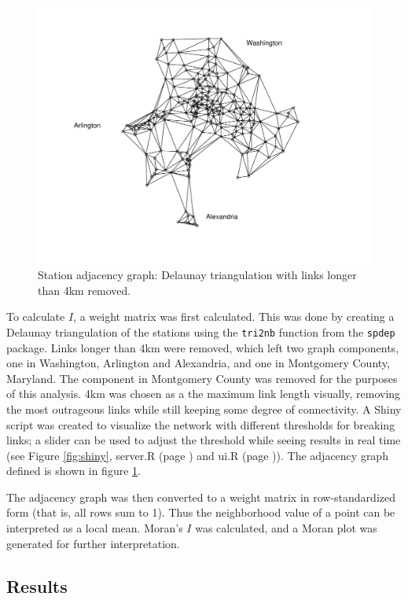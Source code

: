\documentclass[letterpaper,11pt]{article}
\newcommand{\reflst}[1]{#1 (page \pageref{#1})}
\begin{document}
\begin{figure}[t]
  \includegraphics[width=\textwidth]{connectivity_labels.pdf}
  \caption{\label{fig:nbmat} Station adjacency graph: Delaunay triangulation with links
    longer than 4km removed.}
\end{figure}

To calculate $I$, a weight matrix was first calculated. This was done
by creating a Delaunay triangulation of the stations using the
\texttt{tri2nb} function from the \texttt{spdep} package. Links longer
than 4km were removed, which left two graph components, one in
Washington, Arlington and Alexandria, and one in Montgomery County,
Maryland. The component in Montgomery County was removed for the
purposes of this analysis. 4km was chosen as a the maximum link length
visually, removing the most outrageous links while still keeping some
degree of connectivity. A Shiny script was created to visualize the
network with different thresholds for breaking links; a slider can be
used to adjust the threshold while seeing results in real time (see
Figure \ref{fig:shiny}, \reflst{server.R} and \reflst{ui.R}). The
adjacency graph defined is shown in figure \ref{fig:nbmat}.

The adjacency graph was then converted to a weight matrix in
row-standardized form (that is, all rows sum to 1). Thus the
neighborhood value of a point can be interpreted as a local
mean. Moran's $I$ was calculated, and a Moran plot was generated for
further interpretation.

\subsection{Results}
\end{document}
